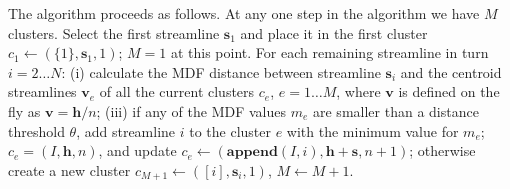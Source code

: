 \documentclass{bioinfo}
\begin{document}
\begin{methods}
The algorithm proceeds as follows.  At any one step in the algorithm we
have $M$ clusters. Select the first streamline $\mathbf{s}_{1}$ and
place it in the first cluster $c_{1}\leftarrow(\{1\},\mathbf{s}_{1},1)$;
$M=1$ at this point.  For each remaining streamline in turn $i = 2 \dots
N$: (i) calculate the MDF distance between streamline $\mathbf{s}_{i}$
and the centroid streamlines $\mathbf{v}_{e}$ of all the current clusters
$c_{e}$, $e = 1 \dots M$, where $\mathbf{v}$ is defined on the fly as
$\mathbf{v}=\mathbf{h}/n$; (iii) if any of the MDF values $m_{e}$ are
smaller than a distance threshold $\theta$, add streamline $i$ to the
cluster $e$ with the minimum value for $m_{e}$;
$c_{e}=(I,\mathbf{h},n)$, and update
$c_{e}\leftarrow(\mathbf{append}(I,i),\mathbf{h}+\mathbf{s},n+1)$;
otherwise create a new cluster
$c_{M+1}\leftarrow([i],\mathbf{s}_{i},1)$, $M\leftarrow M+1$.




\end{methods}
\end{document}
